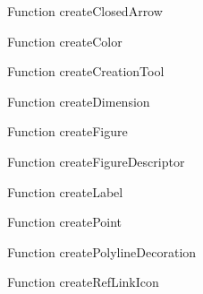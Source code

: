 


\begin{minipage}[b]{0.5\textwidth}
\centering
{}
Function createClosedArrow
\end{minipage}
\begin{minipage}[b]{0.5\textwidth}
\centering
{}
Function createColor
\end{minipage}
\begin{minipage}[b]{0.5\textwidth}
\centering
{}
Function createCreationTool
\end{minipage}
\begin{minipage}[b]{0.5\textwidth}
\centering
{}
Function createDimension
\end{minipage}
\begin{minipage}[b]{0.5\textwidth}
\centering
{}
Function createFigure
\end{minipage}
\begin{minipage}[b]{0.5\textwidth}
\centering
{}
Function createFigureDescriptor
\end{minipage}
\begin{minipage}[b]{0.5\textwidth}
\centering
{}
Function createLabel
\end{minipage}
\begin{minipage}[b]{0.5\textwidth}
\centering
{}
Function createPoint
\end{minipage}
\begin{minipage}[b]{0.5\textwidth}
\centering
{}
Function createPolylineDecoration
\end{minipage}
\begin{minipage}[b]{0.5\textwidth}
\centering
{}
Function createRefLinkIcon
\end{minipage}

